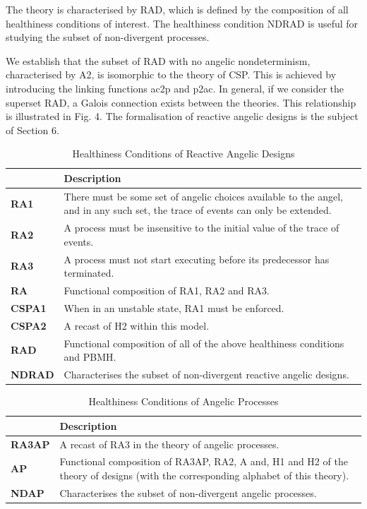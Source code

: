 \documentclass[11pt]{article}
\begin{document}
The theory is characterised by RAD, which is defined by the composition of all healthiness conditions of interest. The healthiness condition NDRAD is useful for studying the subset of non-divergent processes.

We establish that the subset of RAD with no angelic nondeterminism, characterised by A2, is isomorphic to the theory of CSP. This is achieved by introducing the linking functions ac2p and p2ac. In general, if we consider the superset RAD, a Galois connection exists between the theories. This relationship is illustrated in Fig. 4. The formalisation of reactive angelic designs is the subject of Section 6.


\begin{table}[ht]
\centering
\caption{Healthiness Conditions of Reactive Angelic Designs}
\begin{tabularx}{0.96\linewidth}{>{\bfseries}l X}
\toprule
 & \textbf{Description} \\
\midrule
RA1 & There must be some set of angelic choices available to the angel, and in any such set, the trace of events can only be extended. \\
RA2 & A process must be insensitive to the initial value of the trace of events. \\
RA3 & A process must not start executing before its predecessor has terminated. \\
RA  & Functional composition of RA1, RA2 and RA3. \\
CSPA1 & When in an unstable state, RA1 must be enforced. \\
CSPA2 & A recast of H2 within this model. \\
RAD & Functional composition of all of the above healthiness conditions and PBMH. \\
NDRAD & Characterises the subset of non-divergent reactive angelic designs. \\
\bottomrule
\end{tabularx}
\end{table}


\begin{table}[ht]
\centering
\caption{Healthiness Conditions of Angelic Processes}
\begin{tabularx}{0.96\linewidth}{>{\bfseries}l X}
\toprule
 & \textbf{Description} \\
\midrule
RA3AP & A recast of RA3 in the theory of angelic processes. \\
AP & Functional composition of RA3AP, RA2, A and, H1 and H2 of the theory of designs (with the corresponding alphabet of this theory). \\
NDAP & Characterises the subset of non-divergent angelic processes. \\
\bottomrule
\end{tabularx}
\end{table}
\end{document}
